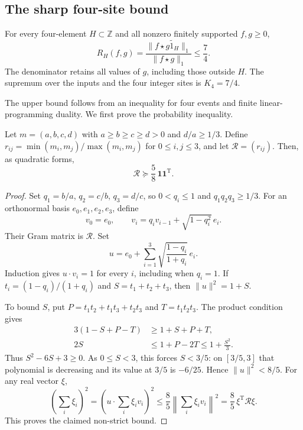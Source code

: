 \subsection{The sharp four-site bound}

\begin{theorem}\label{thm:four-site-sharp}
For every four-element $H\subset\mathbb Z$ and all nonzero finitely
supported $f,g\ge0$,
\begin{equation}\label{eq:four-site-sharp}
 R_H(f,g)=\frac{\|f\star\widetilde{g1_H}\|_1}{\|f\star g\|_1}
 \le\frac74.
\end{equation}
The denominator retains all values of $g$, including those outside $H$.
The supremum over the inputs and the four integer sites is $K_4=7/4$.
\end{theorem}

The upper bound follows from an inequality for four events and finite
linear-programming duality. We first prove the probability inequality.

\begin{lemma}\label{lem:four-ratio-matrix}
Let $m=(a,b,c,d)$ with $a\ge b\ge c\ge d>0$ and $d/a\ge1/3$.
Define $r_{ij}=\min(m_i,m_j)/\max(m_i,m_j)$ for $0\le i,j\le3$,
and let $\mathcal R=(r_{ij})$. Then, as quadratic forms,
\[
 \mathcal R\succeq\frac58\,\mathbf1\mathbf1^{\mathrm T}.
\]
\end{lemma}
\begin{proof}
Set $q_1=b/a$, $q_2=c/b$, $q_3=d/c$, so $0<q_i\le1$ and
$q_1q_2q_3\ge1/3$.  For an orthonormal basis $e_0,e_1,e_2,e_3$,
define
\[
 v_0=e_0,\qquad
 v_i=q_i v_{i-1}+\sqrt{1-q_i^2}\,e_i.
\]
Their Gram matrix is $\mathcal R$.
Set
\[
 u=e_0+\sum_{i=1}^3\sqrt{\frac{1-q_i}{1+q_i}}\,e_i.
\]
Induction gives $u\cdot v_i=1$ for every $i$, including when
$q_i=1$.  If $t_i=(1-q_i)/(1+q_i)$ and $S=t_1+t_2+t_3$, then
$\|u\|^2=1+S$.

To bound $S$, put $P=t_1t_2+t_1t_3+t_2t_3$ and $T=t_1t_2t_3$.
The product condition gives
\[
 \begin{aligned}
 3(1-S+P-T)&\ge1+S+P+T,\\
 2S&\le1+P-2T\le1+\frac{S^2}{3}.
 \end{aligned}
\]
Thus $S^2-6S+3\ge0$.  As $0\le S<3$, this forces $S<3/5$:
on $[3/5,3]$ that polynomial is decreasing and its value at
$3/5$ is $-6/25$.  Hence $\|u\|^2<8/5$.
For any real vector $\xi$,
\[
 \left(\sum_i\xi_i\right)^2
 =\left(u\cdot\sum_i\xi_i v_i\right)^2
 \le\frac85\left\|\sum_i\xi_i v_i\right\|^2
 =\frac85\,\xi^{\mathrm T}\mathcal R\xi.
\]
This proves the claimed non-strict bound.
\end{proof}

